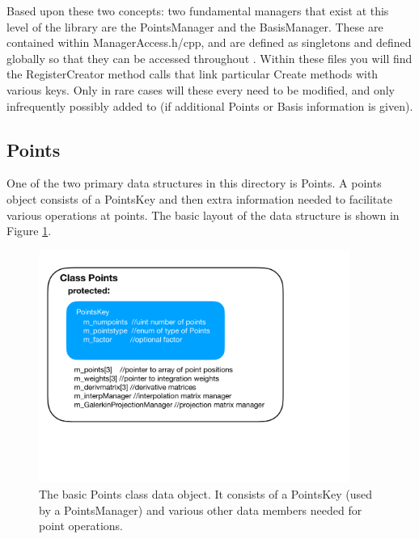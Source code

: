 Based upon these two concepts: two fundamental managers that exist at this level of the library are the PointsManager and the BasisManager.
These are contained within ManagerAccess.h/cpp, and are defined as singletons and defined globally 
so that they can be accessed throughout {\nek}. Within these files you will find the RegisterCreator method 
calls that link particular Create methods with various keys.  Only in rare cases will these
every need to be modified, and only infrequently possibly added to (if additional Points or Basis information is given).


\subsection{Points}
One of the two primary data structures in this directory is Points.  
A points object consists of a PointsKey and then extra information needed
to facilitate various operations at points.  The basic layout of the data structure is shown in Figure \ref{foundations:pointsclass}.

\begin{figure}[htb]
\centering
\includegraphics[width=4in]{img/pointsclass.pdf}
\caption{The basic Points class data object.  It consists of a PointsKey (used by a PointsManager) and various other data members needed for point operations.}
\label{foundations:pointsclass}
\end{figure}


